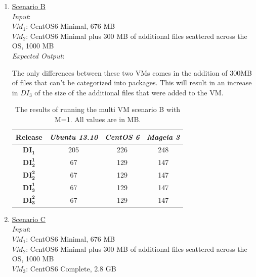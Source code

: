 \begin{enumerate}
\item \underline{Scenario B}\\
\textit{Input}:\\
$VM_1$: CentOS6 Minimal, 676 MB\\
$VM_2$: CentOS6 Minimal plus 300 MB of additional files scattered across the OS, 1000 MB\\

\textit{Expected Output}:


The only differences between these two VMs comes in the addition of 300MB of files that can't be categorized into packages. This will result in an increase in $DI_3$ of the size of the additional files that were added to the VM.

\begin{table}[h]
\centering

    \begin{tabular}{| c | c | c | c|}
    \hline
    \bfseries Release & \itshape Ubuntu 13.10 & \itshape CentOS 6 & \itshape Mageia 3\\ \hline
    \bfseries $\boldsymbol{DI_1}$ & 205 & 226 & 248\\ \hline
    \bfseries $\boldsymbol{DI_2^1}$ & 67 & 129 & 147\\ \hline 
\bfseries $\boldsymbol{DI_2^2}$ & 67 & 129 & 147\\ \hline 
\bfseries $\boldsymbol{DI_3^1}$  & 67 & 129 & 147\\ \hline 
\bfseries $\boldsymbol{DI_3^2}$ & 67 & 129 & 147\\ \hline 
    \end{tabular}
\caption{The results of running the multi VM scenario B with M=1. All values are in MB.}
\label{table:multiscenariob}
\end{table}


\item \underline{Scenario C}\\
\textit{Input}:\\

$VM_1$: CentOS6 Minimal, 676 MB\\
$VM_2$: CentOS6 Minimal plus 300 MB of additional files scattered across the OS, 1000 MB\\
$VM_3$: CentOS6 Complete, 2.8 GB\\


\end{enumerate}
